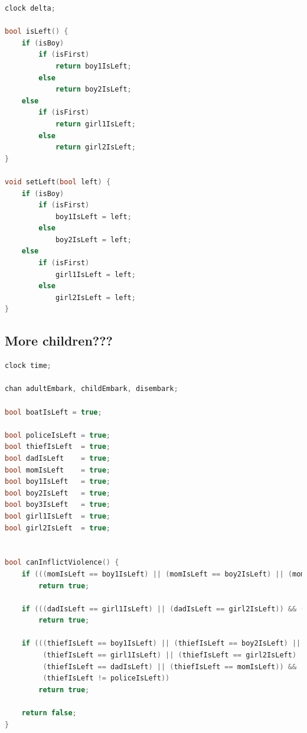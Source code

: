 \documentclass[a4paper,12pt]{scrartcl}
\begin{document}
\begin{lstlisting}[language=CPP, label = lst:plugin_example, caption = Child declaration.]
clock delta;

bool isLeft() {
    if (isBoy)
        if (isFirst)
            return boy1IsLeft;
        else
            return boy2IsLeft;
    else
        if (isFirst)
            return girl1IsLeft;
        else
            return girl2IsLeft;
}

void setLeft(bool left) {
    if (isBoy)
        if (isFirst)
            boy1IsLeft = left;
        else
            boy2IsLeft = left;
    else
        if (isFirst)
            girl1IsLeft = left;
        else
            girl2IsLeft = left;
}
\end{lstlisting}


\subsection*{More children???}

\begin{lstlisting}[language=CPP, label = lst:plugin_example, caption = Global declarations with an extra boy.]
clock time;

chan adultEmbark, childEmbark, disembark;

bool boatIsLeft = true;

bool policeIsLeft = true;
bool thiefIsLeft  = true;
bool dadIsLeft    = true;
bool momIsLeft    = true;
bool boy1IsLeft   = true;
bool boy2IsLeft   = true;
bool boy3IsLeft   = true;
bool girl1IsLeft  = true;
bool girl2IsLeft  = true;


bool canInflictViolence() {
    if (((momIsLeft == boy1IsLeft) || (momIsLeft == boy2IsLeft) || (momIsLeft == boy3IsLeft)) && (momIsLeft != dadIsLeft))
        return true;

    if (((dadIsLeft == girl1IsLeft) || (dadIsLeft == girl2IsLeft)) && (dadIsLeft != momIsLeft))
        return true;

    if (((thiefIsLeft == boy1IsLeft) || (thiefIsLeft == boy2IsLeft) || (thiefIsLeft == boy3IsLeft) ||
         (thiefIsLeft == girl1IsLeft) || (thiefIsLeft == girl2IsLeft) || 
         (thiefIsLeft == dadIsLeft) || (thiefIsLeft == momIsLeft)) && 
         (thiefIsLeft != policeIsLeft))
        return true;

    return false;
}
\end{lstlisting}
\end{document}
